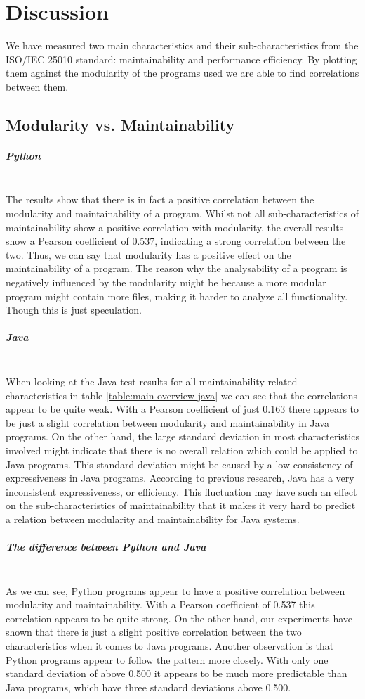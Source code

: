 \documentclass[twoside]{uva-inf-bachelor-thesis}
\newcommand{\myparagraph}[1]{\paragraph{#1}\mbox{}\\}
\begin{document}
\chapter{Discussion}
We have measured two main characteristics and their sub-characteristics from the ISO/IEC 25010 standard: maintainability and performance efficiency. By plotting them against the modularity of the programs used we are able to find correlations between them.

\section{Modularity vs. Maintainability}
\myparagraph{Python}
The results show that there is in fact a positive correlation between the modularity and maintainability of a program. Whilst not all sub-characteristics of maintainability show a positive correlation with modularity, the overall results show a Pearson coefficient of 0.537, indicating a strong correlation between the two. Thus, we can say that modularity has a positive effect on the maintainability of a program. The reason why the analysability of a program is negatively influenced by the modularity might be because a more modular program might contain more files, making it harder to analyze all functionality. Though this is just speculation.

\myparagraph{Java}
When looking at the Java test results for all maintainability-related characteristics in table \ref{table:main-overview-java} we can see that the correlations appear to be quite weak. With a Pearson coefficient of just 0.163 there appears to be just a slight correlation between modularity and maintainability in Java programs. On the other hand, the large standard deviation in most characteristics involved might indicate that there is no overall relation which could be applied to Java programs. This standard deviation might be caused by a low consistency of expressiveness in Java programs. According to previous research\cite{Expressiveness}, Java has a very inconsistent expressiveness, or efficiency. This fluctuation may have such an effect on the sub-characteristics of maintainability that it makes it very hard to predict a relation between modularity and maintainability for Java systems.

\myparagraph{The difference between Python and Java}
As we can see, Python programs appear to have a positive correlation between modularity and maintainability. With a Pearson coefficient of 0.537 this correlation appears to be quite strong. On the other hand, our experiments have shown that there is just a slight positive correlation between the two characteristics when it comes to Java programs. Another observation is that Python programs appear to follow the pattern more closely. With only one standard deviation of above 0.500 it appears to be much more predictable than Java programs, which have three standard deviations above 0.500.\\
\end{document}

